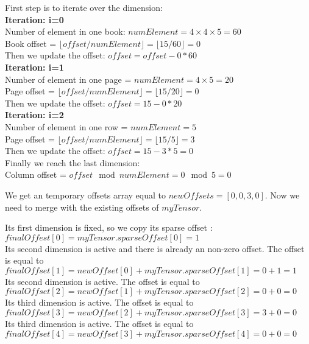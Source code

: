	First step is to iterate over the dimension:\\
	\textbf{Iteration: i=0}\\
	Number of element in one book: $numElement = 4\times 4\times 5 = 60$ \\
	Book offset = $\lfloor offset/numElement\rfloor =  \lfloor 15/60\rfloor = 0$\\  
	Then we update the offset: $offset = offset - 0 * 60$\\
	\textbf{Iteration: i=1}\\
	Number of element in one page = $numElement = 4\times 5 = 20$ \\
	Page offset = $\lfloor offset/numElement\rfloor =  \lfloor 15/20\rfloor = 0$ \\ 
	Then we update the offset: $offset = 15 - 0 * 20$\\
	\textbf{Iteration: i=2}\\
	Number of element in one row = $numElement = 5$\\
	Page offset = $\lfloor offset/numElement\rfloor =  \lfloor 15/5\rfloor = 3$ \\ 
	Then we update the offset: $offset = 15 - 3 * 5 = 0$\\
	
	Finally we reach the last dimension:\\
	Column offset = $offset \mod numElement = 0 \mod 5 = 0$
	
	We get an temporary offsets array equal to $ newOffsets = [0, 0, 3, 0]$. Now we need to merge with the existing offsets of $myTensor$.
	
	Its first dimension is fixed, so we copy its sparse offset :\\ $finalOffest[0] = myTensor.sparseOffset[0] = 1$\\
	Its second dimension is active and there is already an non-zero offset. The offset is equal to\\ $finalOffset[1] = newOffset[0] + myTensor.sparseOffset[1] = 0 + 1 = 1$\\
	Its second dimension is active. The offset is equal to\\ $finalOffset[2] = newOffset[1] + myTensor.sparseOffset[2] = 0 + 0 = 0$\\
	Its third dimension is active. The offset is equal to\\ $finalOffset[3] = newOffset[2] + myTensor.sparseOffset[3] = 3 + 0 = 0$\\
	Its third dimension is active. The offset is equal to\\ $finalOffset[4] = newOffset[3] + myTensor.sparseOffset[4] = 0 + 0 = 0$\\
	
